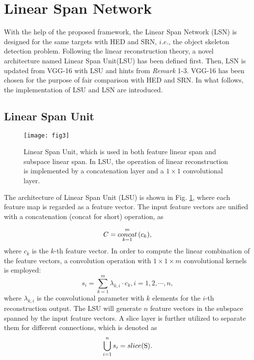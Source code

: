 \documentclass[runningheads]{llncs}
\begin{document}
\section{Linear Span Network}


With the help of the proposed framework, the Linear Span Network (LSN) is designed for the same targets with HED and SRN, $i.e.$, the object skeleton detection problem. Following the linear reconstruction theory, a novel architecture named Linear Span Unit(LSU) has been defined first. Then, LSN is updated from VGG-16 \cite{ref33} with LSU and hints from \textit{Remark} 1-3. VGG-16 has been chosen for the purpose of fair comparison with HED and SRN. In what follows, the implementation of LSU and LSN are introduced. 



\subsection{Linear Span Unit}

\begin{figure}[t]
\centering
\texttt{[image: fig3]}
\caption{Linear Span Unit, which is used in both feature linear span and subspace linear span. In LSU, the operation of linear reconstruction is implemented by a concatenation layer and a $1\times1$ convolutional layer. }
\label{fig:lsu}
\end{figure}


The architecture of Linear Span Unit (LSU) is shown in Fig. \ref{fig:lsu}, where each feature map is regarded as a feature vector. The input feature vectors are unified with a concatenation (concat for short) operation, as 

\begin{equation}{C} = \mathop {concat}\limits_{k = 1}^{m} {\rm{ }}(c_{k}),
   \label{lsu::concat}
\end{equation}
where $c_k$ is the $k$-th feature vector. In order to compute the linear combination of the feature vectors, a convolution operation with $1\times1\times m$ convolutional kernels is employed:
\begin{equation}{{s_i}} = \sum\limits_{k = 1}^m {{\lambda_{k,i}} \cdot {c_{k}}} ,i = 1,2, \cdots ,n,
   \label{lsu::reconstructor}
\end{equation}
where ${\lambda_{k,i}}$ is the convolutional parameter with $k$ elements for the $i$-th reconstruction output. The LSU will generate $n$ feature vectors in the subspace spanned by the input feature vectors. A slice layer is further utilized to separate them for different connections, which is denoted as
\begin{equation}
    \bigcup\limits_{i=1}^{n} s_i = slice({{\rm{S}}}).
    \label{lsu::slice}
\end{equation}
\end{document}
